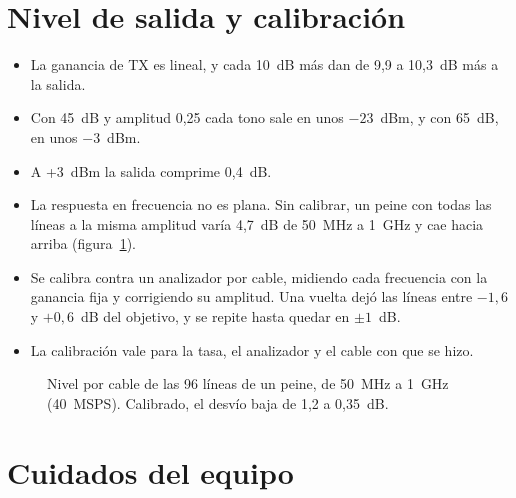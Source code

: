 \documentclass[11pt,a4paper]{article}
\begin{document}
\section{Nivel de salida y calibración}

\begin{itemize}
  \item La ganancia de TX es lineal, y cada 10~dB más dan de 9,9 a 10,3~dB más a la salida.
  \item Con 45~dB y amplitud 0,25 cada tono sale en unos $-23$~dBm, y con 65~dB, en unos $-3$~dBm.
  \item A +3~dBm la salida comprime 0,4~dB.
  \item La respuesta en frecuencia no es plana. Sin calibrar, un peine con todas las líneas a la misma amplitud varía 4,7~dB de 50~MHz a 1~GHz y cae hacia arriba (figura~\ref{fig:peine}).
  \item Se calibra contra un analizador por cable, midiendo cada frecuencia con la ganancia fija y corrigiendo su amplitud. Una vuelta dejó las líneas entre $-1{,}6$ y $+0{,}6$~dB del objetivo, y se repite hasta quedar en $\pm 1$~dB.
  \item La calibración vale para la tasa, el analizador y el cable con que se hizo.
\end{itemize}

\begin{figure}[H]
  \centering
  \caption{Nivel por cable de las 96 líneas de un peine, de 50~MHz a 1~GHz (40~MSPS). Calibrado, el desvío baja de 1,2 a 0,35~dB.}
  \label{fig:peine}
\end{figure}

\section{Cuidados del equipo}
\end{document}
